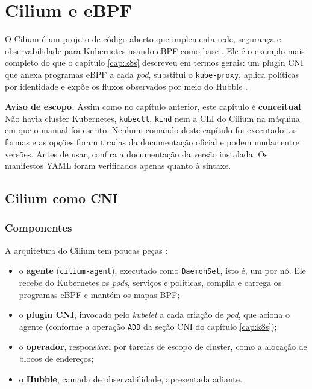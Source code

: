 \chapter{Cilium e eBPF}
\label{cap:cilium}

O Cilium é um projeto de código aberto que implementa rede, segurança e
observabilidade para Kubernetes usando eBPF como base \cite{ciliumdocs}. Ele é o
exemplo mais completo do que o capítulo \ref{cap:k8s} descreveu em termos gerais: um
plugin CNI que anexa programas eBPF a cada \textit{pod}, substitui o
\texttt{kube-proxy}, aplica políticas por identidade e expõe os fluxos observados por
meio do Hubble \cite{hubbledocs}.

\textbf{Aviso de escopo.} Assim como no capítulo anterior, este capítulo é
\textbf{conceitual}. Não havia cluster Kubernetes, \texttt{kubectl}, \texttt{kind} nem
a CLI do Cilium na máquina em que o manual foi escrito. Nenhum comando deste capítulo
foi executado; as formas e as opções foram tiradas da documentação oficial
\cite{ciliumdocs, hubbledocs} e podem mudar entre versões. Antes de usar, confira a
documentação da versão instalada. Os manifestos YAML foram verificados apenas quanto à
sintaxe.

\section{Cilium como CNI}

\subsection*{Componentes}

A arquitetura do Cilium tem poucas peças \cite{ciliumdocs}:

\begin{itemize}
  \item o \textbf{agente} (\texttt{cilium-agent}), executado como \texttt{DaemonSet},
        isto é, um por nó. Ele recebe do Kubernetes os \textit{pods}, serviços e
        políticas, compila e carrega os programas eBPF e mantém os mapas BPF;
  \item o \textbf{plugin CNI}, invocado pelo \textit{kubelet} a cada criação de
        \textit{pod}, que aciona o agente (conforme a operação \texttt{ADD} da seção
        CNI do capítulo \ref{cap:k8s});
  \item o \textbf{operador}, responsável por tarefas de escopo de cluster, como a
        alocação de blocos de endereços;
  \item o \textbf{Hubble}, camada de observabilidade, apresentada adiante.
\end{itemize}

